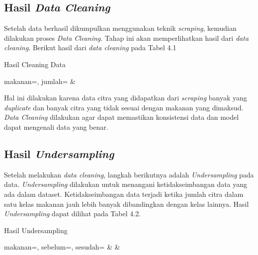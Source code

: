 \subsection{Hasil \textit{Data Cleaning}}
Setelah data berhasil dikumpulkan menggunakan teknik \textit{scraping}, kemudian dilakukan proses \textit{Data Cleaning}. Tahap ini akan memperlihatkan hasil dari \textit{data cleaning}. Berikut hasil dari \textit{data cleaning} pada Tabel 4.1

\begin{atable}
    \centering
    \caption{Hasil Cleaning Data}
    \label{table:hasil-cleaning}
        {makanan=\makanan, jumlah=\jumlah}
        {\makanan & \jumlah}
\end{atable}

Hal ini dilakukan karena data citra yang didapatkan dari \textit{scraping} banyak yang \textit{duplicate} dan banyak citra yang tidak sesuai dengan makanan yang dimaksud. \textit{Data Cleaning} dilakukan agar dapat memastikan konsistensi data dan model dapat mengenali data yang benar.

\subsection{Hasil \textit{Undersampling}}
Setelah melakukan \textit{data cleaning}, langkah berikutnya adalah \textit{Undersampling} pada data. \textit{Undersampling} dilakukan untuk menangani ketidakseimbangan data yang ada dalam dataset. Ketidakseimbangan data terjadi ketika jumlah citra dalam satu kelas makanan jauh lebih banyak dibandingkan dengan kelas lainnya. Hasil \textit{Undersampling} dapat dilihat pada Tabel 4.2.

\begin{atable}
    \centering
    \caption{Hasil Undersampling}
    \label{table:hasil-undersampling}
        {makanan=\makanan, sebelum=\sebelum, sesudah=\sesudah}
        {\makanan & \sebelum & \sesudah}
\end{atable}


